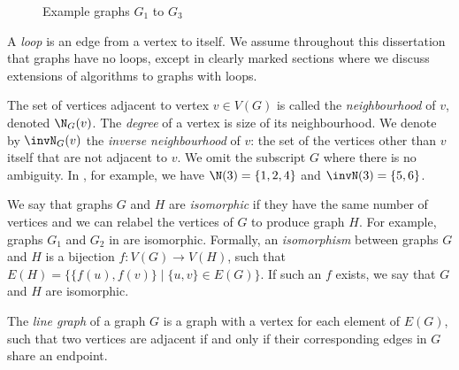 \begin{figure}[htb]
{
        \label{fig:g3}
    }
    \caption{Example graphs $G_1$ to $G_3$}
    \label{fig:intro-examples}
\end{figure}

A \emph{loop} is an edge from a vertex to itself. We assume throughout this
dissertation that graphs have no loops, except in clearly marked sections where
we discuss extensions of algorithms to graphs with loops.

The set of vertices adjacent to vertex $v \in V(G)$
is called the \emph{neighbourhood} of $v$, denoted $\N_G(v)$.
The \emph{degree} of a vertex is size of its neighbourhood.
We denote
by $\invN_G(v)$ the \emph{inverse neighbourhood} of $v$: the set
of the vertices other than $v$ itself that are not adjacent to $v$.
We omit the subscript $G$ where there is no ambiguity.
In , for example, we have $\N(3) = \{1,2,4\}$ and
$\invN(3) = \{5,6\}$.

We say that graphs $G$ and $H$ are \emph{isomorphic} if they have the same
number of vertices and we can relabel the vertices of $G$ to produce graph $H$.
For example, graphs $G_1$ and $G_2$ in  are
isomorphic.  Formally, an \emph{isomorphism} between graphs $G$ and $H$ is a
bijection $f:V(G)\rightarrow V(H)$, such that $E(H) = \{\{f(u), f(v)\} \mid \{u,
v\} \in E(G)\}$.  If such an $f$ exists, we say that $G$ and $H$ are
isomorphic.

The \emph{line graph} of a graph $G$ is a graph with a vertex for each element
of $E(G)$, such that two vertices are adjacent if and only if their corresponding edges
in $G$ share an endpoint.

